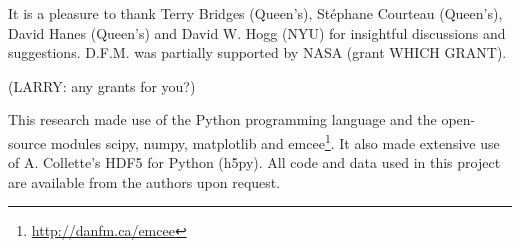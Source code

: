\documentclass[preprint,12pt]{aastex}
\newcommand{\project}[1]{{\sffamily #1}}
\begin{document}














\acknowledgments It is a pleasure to thank Terry Bridges (Queen's),
St\'ephane Courteau (Queen's), David Hanes (Queen's) and David W. Hogg (NYU)
for insightful discussions and suggestions. D.F.M. was partially supported
by NASA (grant WHICH GRANT).

(LARRY: any grants for you?)

This research made use of the \project{Python} programming language and the
open-source modules \project{scipy}, \project{numpy}, \project{matplotlib}
and \project{emcee}\footnote{\url{http://danfm.ca/emcee}}.  It also
made extensive use of A. Collette's HDF5 for Python (\project{h5py}). All
code and data used in this project are available from the authors upon
request.

\newcommand{\arxiv}[1]{\href{http://arxiv.org/abs/#1}{arXiv:#1}}


\end{document}
